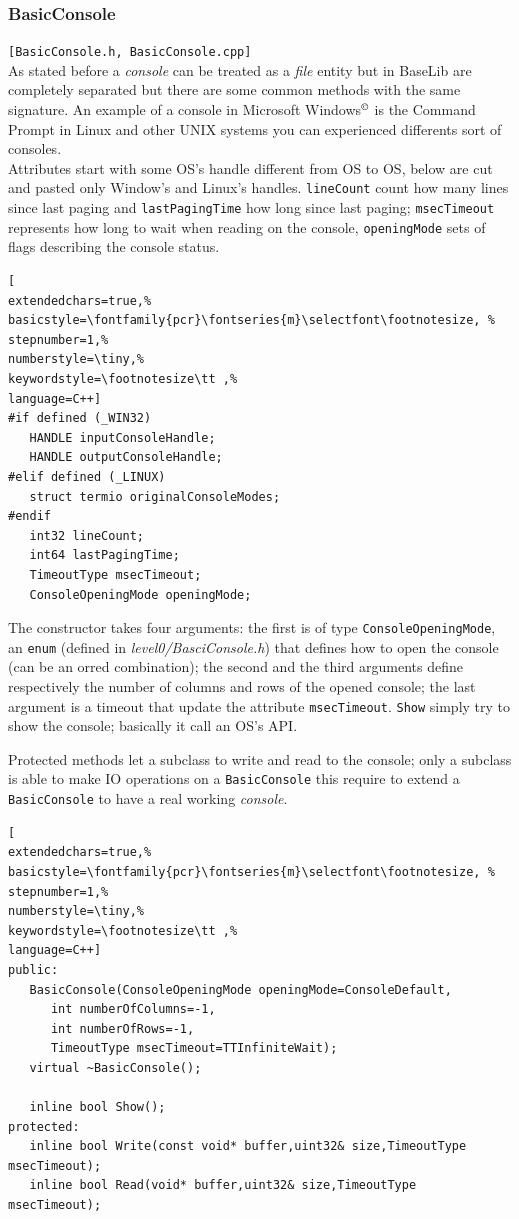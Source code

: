 \subsubsection{BasicConsole}
\texttt{[BasicConsole.h, BasicConsole.cpp]}\\
As stated before a \textit{console} can be treated as a \textit{file} entity but in BaseLib are completely separated but there are some common methods with the same signature. An example of a console in Microsoft Windows$^{\copyright}$ is the Command Prompt in Linux and other UNIX systems you can experienced differents sort of consoles. \\


Attributes start with some OS's handle different from OS to OS, below are cut and pasted only Window's and Linux's handles. \texttt{lineCount} count how many lines since last paging and \texttt{lastPagingTime} how long since last paging; \texttt{msecTimeout} represents how long to wait when reading on the console, \texttt{openingMode} sets of flags describing the console status.

\begin{lstlisting}[
extendedchars=true,%
basicstyle=\fontfamily{pcr}\fontseries{m}\selectfont\footnotesize, %
stepnumber=1,%
numberstyle=\tiny,%
keywordstyle=\footnotesize\tt ,%
language=C++]
#if defined (_WIN32)
   HANDLE inputConsoleHandle;
   HANDLE outputConsoleHandle;
#elif defined (_LINUX)
   struct termio originalConsoleModes;
#endif
   int32 lineCount;
   int64 lastPagingTime;
   TimeoutType msecTimeout;
   ConsoleOpeningMode openingMode;
\end{lstlisting}

The constructor takes four arguments: the first is of type \texttt{ConsoleOpeningMode}, an \texttt{enum} (defined in \textit{level0/BasciConsole.h}) that defines how to open the console (can be an orred combination); the second and the third arguments define respectively the number of columns and rows of the opened console; the last argument is a timeout that update the attribute \texttt{msecTimeout}.
\texttt{Show} simply try to show the console; basically it call an OS's API.

Protected methods let a subclass to write and read to the console; only a subclass is able to make IO operations on a \texttt{BasicConsole} this require to extend a \texttt{BasicConsole} to have a real working \textit{console}.


\begin{lstlisting}[
extendedchars=true,%
basicstyle=\fontfamily{pcr}\fontseries{m}\selectfont\footnotesize, %
stepnumber=1,%
numberstyle=\tiny,%
keywordstyle=\footnotesize\tt ,%
language=C++]
public:
   BasicConsole(ConsoleOpeningMode openingMode=ConsoleDefault,
      int numberOfColumns=-1,
      int numberOfRows=-1,
      TimeoutType msecTimeout=TTInfiniteWait);
   virtual ~BasicConsole();

   inline bool Show();
protected:
   inline bool Write(const void* buffer,uint32& size,TimeoutType msecTimeout);
   inline bool Read(void* buffer,uint32& size,TimeoutType msecTimeout);
\end{lstlisting}

